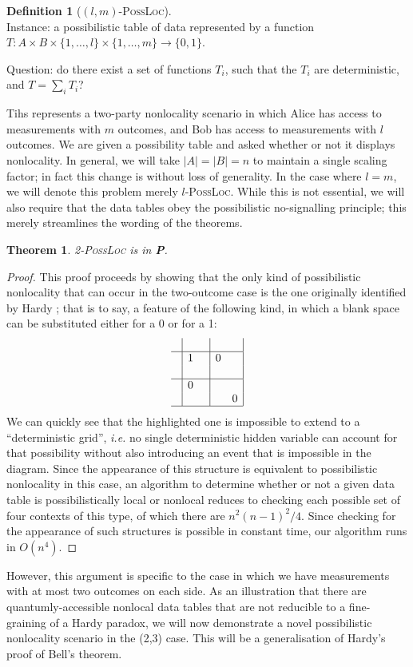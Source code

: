 \documentclass[reprint]{revtex4-1}
\newtheorem{thm}{Theorem}
\theoremstyle{definition}
\newtheorem{defn}{Definition}
\begin{document}
\begin{defn}[$(l,m)$-\textsc{PossLoc}]
\quad\\
Instance: a possibilistic table of data represented by a  function $T:A\times B \times \{1,\dots, l\}\times \{1,\dots, m\}\rightarrow\{0,1\}$.

Question: do there exist a set of functions $T_i$, such that the $T_i$ are deterministic, and $T=\sum_i T_i$?
\end{defn}
Tihs represents a two-party nonlocality scenario in which Alice has access to measurements with $m$ outcomes, and Bob has access to measurements with $l$ outcomes. We are given a possibility table and asked whether or not it displays nonlocality. In general, we will take $|A|=|B|=n$ to maintain a single scaling factor; in fact this change is without loss of generality. In the case where $l=m$, we will denote this problem merely $l$-\textsc{PossLoc}. While this is not essential, we will also require that the data tables obey the possibilistic no-signalling principle; this merely streamlines the wording of the theorems. 
\begin{thm} \cite{Mans2017}
2-\textsc{PossLoc} is in \textbf{P}.
\end{thm}
\begin{proof}
This proof proceeds by showing that the only kind of possibilistic nonlocality that can occur in the two-outcome case is the one originally identified by Hardy \cite{Hard1993}; that is to say, a feature of the following kind, in which a blank space can be substituted either for a 0 or for a 1:
\begin{equation*}
\begin{array}{c| c c | c c |}
&&&&\\ \hline
&1 & & 0 & \\
&& & & \\ \hline
&0& & &  \\
&& & & 0 \\ \hline
\end{array}
\end{equation*}
We can quickly see that the highlighted one is impossible to extend to a ``deterministic grid'', \emph{i.e.} no single deterministic hidden variable can account for that possibility without also introducing an event that is impossible in the diagram. Since the appearance of this structure is equivalent to possibilistic nonlocality in this case, an algorithm to determine whether or not a given data table is possibilistically local or nonlocal reduces to checking each possible set of four contexts of this type, of which there are $n^2(n-1)^2/4$. Since checking for the appearance of such structures is possible in constant time, our algorithm runs in $O(n^4)$.
\end{proof}
However, this argument is specific to the case in which we have measurements with at most two outcomes on each side. As an illustration that there are quantumly-accessible nonlocal data tables that are not reducible to a fine-graining of a Hardy paradox, we will now demonstrate a novel possibilistic nonlocality scenario in the (2,3) case. This will be a generalisation of Hardy's proof of Bell's theorem.
\end{document}
